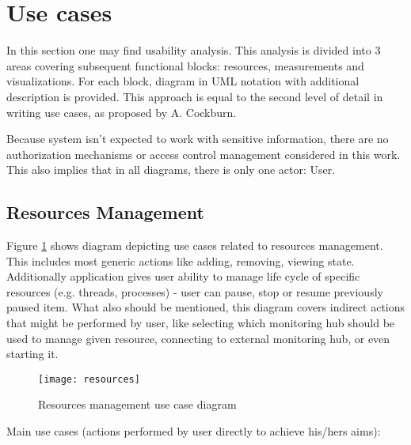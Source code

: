 %
\section{Use cases}
\label{sec:ch4_usecases}

In this section one may find usability analysis. This analysis is divided into 3 areas covering subsequent functional blocks: resources, measurements and visualizations. For each block, diagram in UML notation with additional description is provided. This approach is equal to the second level of detail in writing use cases, as proposed by A. Cockburn\cite{0201702258}. 

Because system isn't expected to work with sensitive information, there are no authorization mechanisms or access control management considered in this work. This also implies that in all diagrams, there is only one actor: User.

\subsection{Resources Management}
\label{subsec:resources_mgmnt}

Figure \ref{fig:usecase_resources} shows diagram depicting use cases related to resources management. This includes most generic actions like adding, removing, viewing state. Additionally application gives user ability to manage life cycle of specific resources (e.g. threads, processes) - user can pause, stop or resume previously paused item. What also should be mentioned, this diagram covers indirect actions that might be performed by user, like selecting which monitoring hub should be used to manage given resource, connecting to external monitoring hub, or even starting it.

\begin{figure}[ht]
\centering
\texttt{[image: resources]}
\caption{Resources management use case diagram}
\label{fig:usecase_resources}
\end{figure}

Main use cases (actions performed by user directly to achieve his/hers aims):

